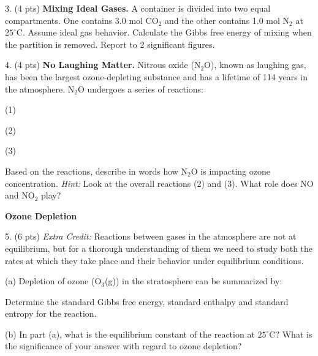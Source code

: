 \documentclass[11pt]{article}
\begin{document}

\vspace{2in}

3. (4 pts) \textbf{Mixing Ideal Gases.} A container is divided into two equal compartments.
One contains 3.0 mol CO$_2$ and the other contains 1.0 mol N$_2$ at $25^\circ\text{C}$.
Assume ideal gas behavior. Calculate the Gibbs free energy of mixing when the partition
is removed. Report to 2 significant figures.


\vspace{2in}

4. (4 pts) \textbf{No Laughing Matter.} Nitrous oxide (N$_2$O), known as laughing gas,
has been the largest ozone-depleting substance and has a lifetime of 114 years in the
atmosphere. N$_2$O undergoes a series of reactions:
\begin{center}
   (1)\par
   (2)\par
   (3)\par
\end{center}
Based on the reactions, describe in words how N$_2$O is impacting ozone concentration.
\textit{Hint:} Look at the overall reactions (2) and (3). What role does NO and NO$_2$ play?

\pagebreak

\textbf{Ozone Depletion}

5. (6 pts) \textit{Extra Credit:} Reactions between gases in the atmosphere are not at equilibrium,
but for a thorough understanding of them we need to study both the rates at which they take
place and their behavior under equilibrium conditions.

(a) Depletion of ozone (O$_3$(g)) in the stratosphere can be summarized by:
\begin{center}
\end{center}
Determine the standard Gibbs free energy, standard enthalpy and standard entropy for the
reaction.

(b) In part (a), what is the equilibrium constant of the reaction at $25^\circ\text{C}$?
What is the significance of your answer with regard to ozone depletion?
\end{document}
